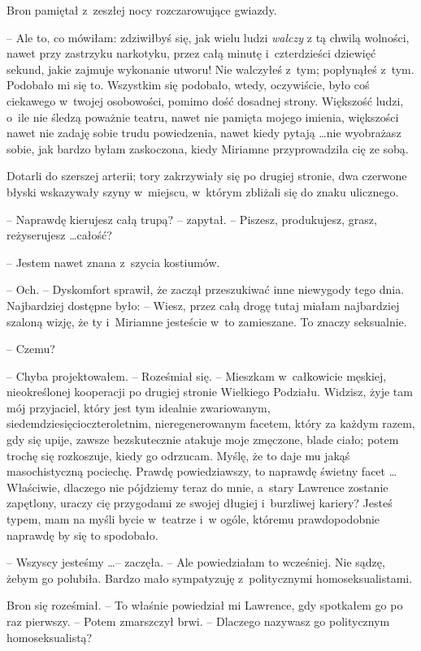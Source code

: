 \documentclass[oneside,polish,11pt,rmheadings]{mwbk}
\begin{document}
Bron pamiętał z~zeszłej nocy rozczarowujące gwiazdy. 

-- Ale to, co mówiłam: zdziwiłbyś się, jak wielu ludzi \textit{walczy }z tą chwilą wolności, nawet przy zastrzyku narkotyku, przez całą minutę i~czterdzieści dziewięć sekund, jakie zajmuje wykonanie utworu! Nie walczyłeś z~tym; popłynąłeś z~tym. Podobało mi się to. Wszystkim się podobało, wtedy, oczywiście, było coś ciekawego w~twojej osobowości, pomimo dość dosadnej strony. Większość ludzi, o~ile nie śledzą poważnie teatru, nawet nie pamięta mojego imienia, większości nawet nie zadaję sobie trudu powiedzenia, nawet kiedy pytają \ldots  nie wyobrażasz sobie, jak bardzo byłam zaskoczona, kiedy Miriamne przyprowadziła cię ze sobą. 

Dotarli do szerszej arterii; tory zakrzywiały się po drugiej stronie, dwa czerwone błyski wskazywały szyny w~miejscu, w~którym zbliżali się do znaku ulicznego. 

-- Naprawdę kierujesz całą trupą? -- zapytał. -- Piszesz, produkujesz, grasz, reżyserujesz \ldots  całość? 

-- Jestem nawet znana z~szycia kostiumów.  

-- Och. -- Dyskomfort sprawił, że zaczął przeszukiwać inne niewygody tego dnia.  Najbardziej dostępne było: -- Wiesz, przez całą drogę tutaj miałam najbardziej szaloną wizję, że ty i~Miriamne jesteście w~to zamieszane. To znaczy seksualnie. 

-- Czemu? 

-- Chyba projektowałem. -- Roześmiał się.  -- Mieszkam w~całkowicie męskiej, nieokreślonej kooperacji po drugiej stronie Wielkiego Podziału. Widzisz, żyje tam mój przyjaciel, który jest tym idealnie zwariowanym, siedemdziesięcioczteroletnim, nieregenerowanym facetem, który za każdym razem, gdy się upije, zawsze bezskutecznie atakuje moje zmęczone, blade ciało; potem trochę się rozkoszuje, kiedy go odrzucam. Myślę, że to daje mu jakąś masochistyczną pociechę. Prawdę powiedziawszy, to naprawdę świetny facet \ldots  Właściwie, dlaczego nie pójdziemy teraz do mnie, a~stary Lawrence zostanie zapętlony, uraczy cię przygodami ze swojej długiej i~burzliwej kariery? Jesteś typem, mam na myśli bycie w~teatrze i~w ogóle, któremu prawdopodobnie naprawdę by się to spodobało. 

-- Wszyscy jesteśmy \ldots  -- zaczęła. -- Ale powiedziałam to wcześniej. Nie sądzę, żebym go polubiła. Bardzo mało sympatyzuję z~politycznymi homoseksualistami. 

Bron się roześmiał. -- To właśnie powiedział mi Lawrence, gdy spotkałem go po raz pierwszy. -- Potem zmarszczył brwi.  -- Dlaczego nazywasz go politycznym homoseksualistą? 
\end{document}
